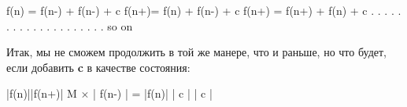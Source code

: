 \vspace{\baselineskip}
\begin{tcolorbox}
f(n)\hspace{2,5mm} = \hspace{2,5mm}f(n-)\hspace*{2,3mm} + \hspace*{0,6mm} f(n-)\hspace*{1,5mm} + \hspace*{1,5mm}c\newline
f(n+)\hspace*{3mm}=\hspace*{2mm} f(n)\hspace*{1,9mm} +\hspace*{1,9mm} f(n-)\hspace*{1,7mm} +\hspace*{1,5mm} c\newline
f(n+)\hspace*{2mm} = \hspace*{2mm}f(n+)\hspace*{0,9mm} +\hspace{0,9mm} f(n)\hspace*{1,5mm} +\hspace*{1,5mm} c\newline
. . . . . . . . . . . . . . . . . . . . so on
\end{tcolorbox}

\vspace{\baselineskip}
Итак, мы не сможем продолжить в той же манере, что и раньше, но что будет, если добавить \textbf{c} в качестве состояния:

\vspace{\baselineskip}
\begin{tcolorbox}
  
\hspace{13,4mm} |\hspace{3,5mm}f(n)\hspace{4,4mm}|\hspace{12,5mm}|\hspace{2,5mm}f(n+)\hspace{3mm}|\newline
\hspace*{3,5mm} M $\times$ |\hspace{1mm} f(n-)\hspace{1mm} |\hspace{3,1mm} = \hspace*{3,1mm}|\hspace{4mm}f(n)\hspace{7mm}|\newline
\hspace*{14,6mm}|\hspace*{5,3mm} c \hspace*{5,3mm}|\hspace*{10,7mm} |\hspace*{6mm} c \hspace*{6mm} |


\end{tcolorbox}


